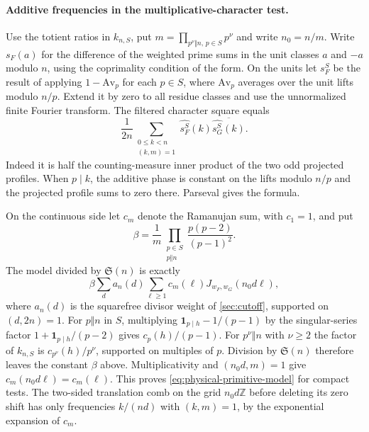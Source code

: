 \documentclass[11pt,a4paper]{article}
\numberwithin{equation}{section}
\newcommand{\SSS}{\mathfrak S}
\begin{document}
\paragraph{Additive frequencies in the multiplicative-character test.}
Use the totient ratios in $k_{n,S}$, put
$m=\prod_{p^\nu\Vert n,\,p\in S}p^\nu$ and write $n_0=n/m$.
Write $s_F(a)$ for the difference of the weighted prime sums in
the unit classes $a$ and $-a$ modulo $n$, using the coprimality
condition of the form. On the units let $s_F^S$ be the result
of applying $1-\mathrm{Av}_p$ for each $p\in S$, where
$\mathrm{Av}_p$ averages over the unit lifts modulo $n/p$.
Extend it by zero to all residue classes and use the unnormalized
finite Fourier transform. The filtered character square equals
\[
 \frac1{2n}\sum_{\substack{0\le k<n\\(k,m)=1}}
       \widehat{s_F^S}(k)\overline{\widehat{s_G^S}(k)}.
\]
Indeed it is half the counting-measure inner product of the
two odd projected profiles. When $p\mid k$, the additive phase
is constant on the lifts modulo $n/p$ and the projected profile
sums to zero there. Parseval gives the formula.

On the continuous side let $c_m$ denote the Ramanujan sum,
with $c_1=1$, and put
\[
 \beta=\frac1m\prod_{\substack{p\in S\\p\Vert n}}
                   \frac{p(p-2)}{(p-1)^2}.
\]
The model divided by $\SSS(n)$ is exactly
\begin{equation}
 \beta\sum_d a_n(d)\sum_{\ell\ge1}c_m(\ell)
                     J_{w_F,w_G}(n_0 d\ell),
 \label{eq:physical-primitive-model}
\end{equation}
where $a_n(d)$ is the squarefree divisor weight of
\cref{sec:cutoff}, supported on $(d,2n)=1$. For $p\Vert n$ in
$S$, multiplying $\mathbf1_{p\mid h}-1/(p-1)$ by the singular-series
factor $1+\mathbf1_{p\mid h}/(p-2)$ gives $c_p(h)/(p-1)$.
For $p^\nu\Vert n$ with $\nu\ge2$ the factor of $k_{n,S}$ is
$c_{p^\nu}(h)/p^\nu$, supported on multiples of $p$. Division by
$\SSS(n)$ therefore leaves the constant $\beta$ above.
Multiplicativity and $(n_0d,m)=1$ give $c_m(n_0d\ell)=c_m(\ell)$.
This proves \eqref{eq:physical-primitive-model} for compact tests.
The two-sided translation comb on the grid $n_0d\mathbb Z$ before
deleting its zero shift has only frequencies $k/(nd)$ with
$(k,m)=1$, by the exponential expansion of $c_m$.
\end{document}
